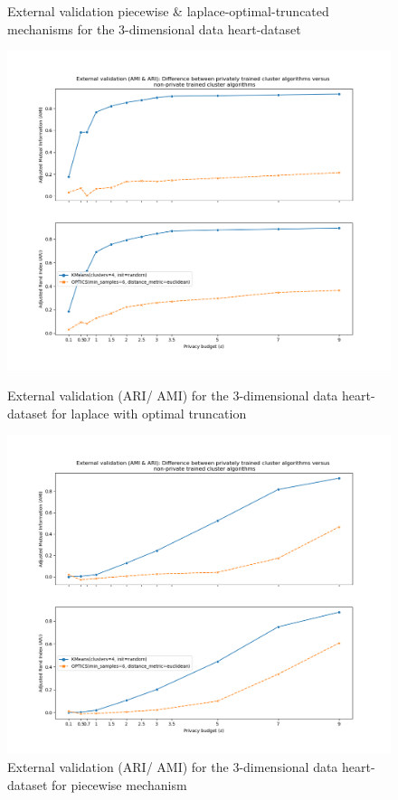 \begin{figure}[H]
\end{figure}
\begin{figure}[H]
    \caption{External validation piecewise \& laplace-optimal-truncated mechanisms for the 3-dimensional data heart-dataset}
    \centering
    \begin{minipage}[c]{0.49\textwidth}
        \includegraphics[width=1\textwidth]{Results/3d-laplace-optimal-truncated/heart-dataset/ami-and-ari.png}
        \caption{External validation (ARI/ AMI) for the 3-dimensional data heart-dataset for laplace with optimal truncation}
        \label{fig:external-validation-heart-dataset_comparison_3d-laplace}
    \end{minipage}
    \begin{minipage}[c]{0.49\textwidth}
        \includegraphics[width=1\textwidth]{Results/3d-piecewise/heart-dataset/ami-and-ari.png}
        \caption{External validation (ARI/ AMI) for the 3-dimensional data heart-dataset for piecewise mechanism}
        \label{fig:external-validation-heart-dataset_comparison_3d-piecewise}
    \end{minipage}
\end{figure}
